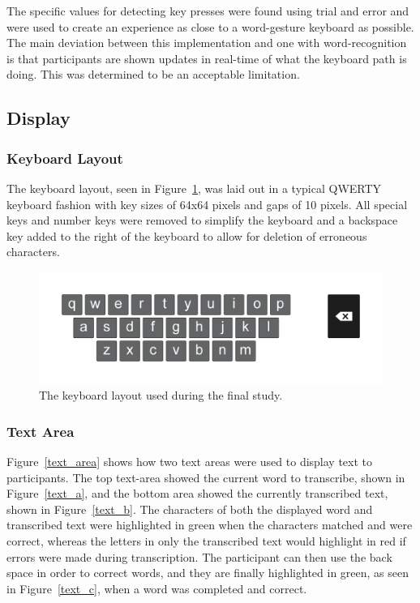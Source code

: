 The specific values for detecting key presses were found using trial and error and were used to create an experience as close to a word-gesture keyboard as possible. The main deviation between this implementation and one with word-recognition is that participants are shown updates in real-time of what the keyboard path is doing. This was determined to be an acceptable limitation.

\subsection{Display}
\subsubsection{Keyboard Layout}
The keyboard layout, seen in Figure~\ref{keyboard_layout}, was laid out in a typical QWERTY keyboard fashion with key sizes of 64x64 pixels and gaps of 10 pixels. All special keys and number keys were removed to simplify the keyboard and a backspace key added to the right of the keyboard to allow for deletion of erroneous characters.

\begin{figure}[h]
	\centering
	\includegraphics[width=6in]{fig_final_keyboard}
	\caption[Display: Keyboard Layout]{The keyboard layout used during the final study.}
	\label{keyboard_layout}
\end{figure}

\subsubsection{Text Area}
Figure~\ref{text_area} shows how two text areas were used to display text to participants. The top text-area showed the current word to transcribe, shown in Figure~\ref{text_a}, and the bottom area showed the currently transcribed text, shown in Figure~\ref{text_b}. The characters of both the displayed word and transcribed text were highlighted in green when the characters matched and were correct, whereas the letters in only the transcribed text would highlight in red if errors were made during transcription. The participant can then use the back space in order to correct words, and they are finally highlighted in green, as seen in Figure~\ref{text_c}, when a word was completed and correct.

